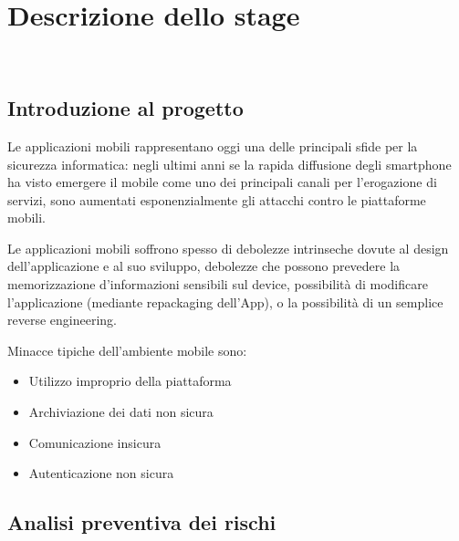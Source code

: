 
\chapter{Descrizione dello stage}
\label{ch:descrizione-stage}

\\

\section{Introduzione al progetto}\label{sec:introduzione-al-progetto}
Le applicazioni mobili rappresentano oggi una delle principali sfide per la sicurezza informatica: negli ultimi anni se la rapida diffusione degli smartphone ha visto emergere il mobile come uno dei principali canali per l'erogazione di servizi, sono aumentati esponenzialmente gli attacchi contro le piattaforme mobili.

Le applicazioni mobili soffrono spesso di debolezze intrinseche dovute al design dell'applicazione e al suo sviluppo, debolezze che possono prevedere la memorizzazione d'informazioni sensibili sul device, possibilità di modificare l'applicazione (mediante repackaging dell'App), o la possibilità di un semplice reverse engineering.

Minacce tipiche dell'ambiente mobile sono:
\begin{itemize}
    \setlength\itemsep{0.1em}
    \item Utilizzo improprio della piattaforma
    \item Archiviazione dei dati non sicura
    \item Comunicazione insicura
    \item Autenticazione non sicura
\end{itemize}

\section{Analisi preventiva dei rischi}\label{sec:analisi-preventiva-dei-rischi}

